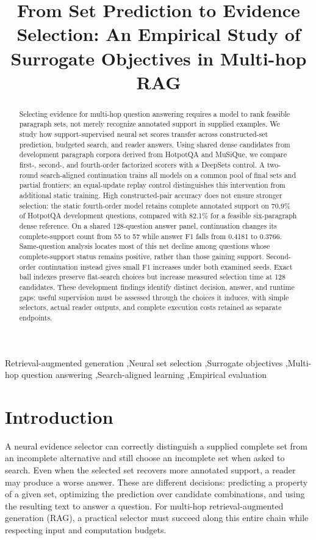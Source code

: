 \documentclass[preprint,12pt]{elsarticle}
\begin{document}
\begin{frontmatter}
\title{From Set Prediction to Evidence Selection: An Empirical Study of Surrogate Objectives in Multi-hop RAG}
\begin{abstract}
Selecting evidence for multi-hop question answering requires a model to rank feasible paragraph sets, not merely recognize annotated support in supplied examples. We study how support-supervised neural set scores transfer across constructed-set prediction, budgeted search, and reader answers. Using shared dense candidates from development paragraph corpora derived from HotpotQA and MuSiQue, we compare first-, second-, and fourth-order factorized scorers with a DeepSets control. A two-round search-aligned continuation trains all models on a common pool of final sets and partial frontiers; an equal-update replay control distinguishes this intervention from additional static training. High constructed-pair accuracy does not ensure stronger selection: the static fourth-order model retains complete annotated support on 70.9\% of HotpotQA development questions, compared with 82.1\% for a feasible six-paragraph dense reference. On a shared 128-question answer panel, continuation changes its complete-support count from 55 to 57 while answer F1 falls from 0.4181 to 0.3766. Same-question analysis locates most of this net decline among questions whose complete-support status remains positive, rather than those gaining support. Second-order continuation instead gives small F1 increases under both examined seeds. Exact ball indexes preserve flat-search choices but increase measured selection time at 128 candidates. These development findings identify distinct decision, answer, and runtime gaps: useful supervision must be assessed through the choices it induces, with simple selectors, actual reader outputs, and complete execution costs retained as separate endpoints.
\end{abstract}
\begin{keyword}
Retrieval-augmented generation \sep Neural set selection \sep Surrogate objectives \sep Multi-hop question answering \sep Search-aligned learning \sep Empirical evaluation
\end{keyword}
\end{frontmatter}

\section{Introduction}
A neural evidence selector can correctly distinguish a supplied complete set from an incomplete alternative and still choose an incomplete set when asked to search. Even when the selected set recovers more annotated support, a reader may produce a worse answer. These are different decisions: predicting a property of a given set, optimizing the prediction over candidate combinations, and using the resulting text to answer a question. For multi-hop retrieval-augmented generation (RAG), a practical selector must succeed along this entire chain while respecting input and computation budgets.
\end{document}

